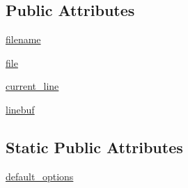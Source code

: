 \subsection*{Public Attributes}
\begin{DoxyCompactItemize}
\item 
\hyperlink{classsetuptools_1_1__distutils_1_1text__file_1_1TextFile_afa3c8c807f2d41d1b545d0c5234d57b1}{filename}
\item 
\hyperlink{classsetuptools_1_1__distutils_1_1text__file_1_1TextFile_abd3c184f659c9267591b68eed9e6263a}{file}
\item 
\hyperlink{classsetuptools_1_1__distutils_1_1text__file_1_1TextFile_a49e7af06d40b2910671c071d1f3cc6dd}{current\+\_\+line}
\item 
\hyperlink{classsetuptools_1_1__distutils_1_1text__file_1_1TextFile_ae3e8575ddfdc38a481b2d3d1eff04310}{linebuf}
\end{DoxyCompactItemize}
\subsection*{Static Public Attributes}
\begin{DoxyCompactItemize}
\item 
\hyperlink{classsetuptools_1_1__distutils_1_1text__file_1_1TextFile_a71d965855d1054e610eb69172c6c25ed}{default\+\_\+options}
\end{DoxyCompactItemize}


